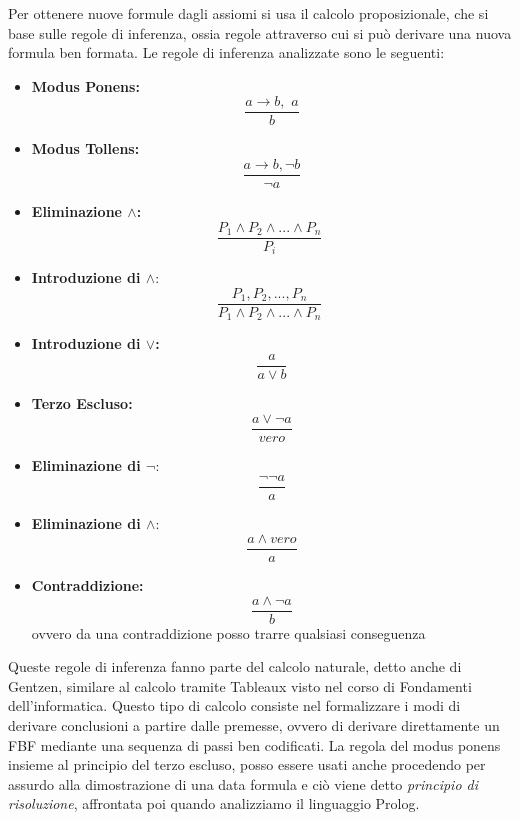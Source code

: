 \documentclass[a4paper]{book}
\begin{document}
Per ottenere nuove formule dagli assiomi si usa il calcolo proposizionale, che si base sulle regole di inferenza, ossia regole attraverso
cui si può derivare una nuova formula ben formata.\newline
Le regole di inferenza analizzate sono le seguenti:
\begin{itemize}
\item \textbf{Modus Ponens:}
  \begin{equation*}
    \frac{a\to b,\,\,a}{b}
  \end{equation*}
\item \textbf{Modus Tollens:}
  \begin{equation*}
    \frac{a\to b, \neg b}{\neg a}
  \end{equation*}
\item \textbf{Eliminazione $\land$:}
  \begin{equation*}
    \frac{P_1\land P_2 \land ... \land P_n}{P_i}\,\,
  \end{equation*}
\item \textbf{Introduzione di $\land$}:
  \begin{equation*}
    \frac{P_1, P_2,...,P_n}{P_1\land P_2 \land ... \land P_n}\,\,
  \end{equation*}
\item \textbf{Introduzione di $\lor$:}
  \begin{equation*}
    \frac{a}{a \lor b}
  \end{equation*}
\item \textbf{Terzo Escluso:}
  \begin{equation*}
    \frac{a \lor \neg a}{vero}
  \end{equation*}

\item \textbf{Eliminazione di $\neg$}:
  \begin{equation*}
    \frac{\neg \neg a}{a}
  \end{equation*}

\item \textbf{Eliminazione di $\land$}:
  \begin{equation*}
    \frac{a \land vero}{a}
  \end{equation*}
\item \textbf{Contraddizione:}
  \begin{equation*}
    \frac{a \land \neg a}{b}
  \end{equation*}
ovvero da una contraddizione posso trarre qualsiasi conseguenza
\end{itemize}
Queste regole di inferenza fanno parte del calcolo naturale, detto anche di Gentzen, similare al calcolo tramite Tableaux visto nel corso
di Fondamenti dell'informatica.\newline
Questo tipo di calcolo consiste nel formalizzare i modi di derivare conclusioni a partire dalle premesse, ovvero di derivare direttamente un FBF
mediante una sequenza di passi ben codificati.\newline
La regola del modus ponens  insieme al principio del terzo escluso, posso essere usati anche procedendo per assurdo alla dimostrazione
di una data formula e ciò viene detto \emph{principio di risoluzione}, affrontata poi quando analizziamo il linguaggio Prolog.
\end{document}
